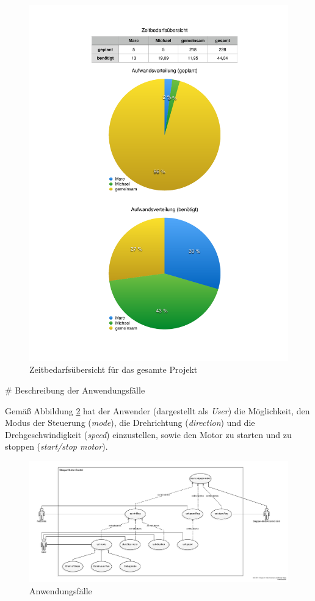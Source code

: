 \documentclass[ngerman,fontsize=12pt , paper=a4 , twoside=false , DIV12 , BCOR=1cm ,
numbers=enddot , listof=totoc , bibliography=totoc , index=totoc ,
headings=small , headlines=1.5 , final]{scrbook}
\begin{document}
\begin{figure}[htbp]
\centering
\includegraphics{../../Planning/Zeitbedarf.pdf}
\caption{Zeitbedarfsübersicht für das gesamte
Projekt\label{fig:zeitbedarf}}
\end{figure}

\newpage
\# Beschreibung der Anwendungsfälle

Gemäß Abbildung \ref{fig:anwendungsfaelle} hat der Anwender (dargestellt
als \emph{User}) die Möglichkeit, den Modus der Steuerung (\emph{mode}),
die Drehrichtung (\emph{direction}) und die Drehgeschwindigkeit
(\emph{speed}) einzustellen, sowie den Motor zu starten und zu stoppen
(\emph{start/stop motor}).

\begin{figure}[htbp]
\centering
\includegraphics{../Diagrams/UseCases.pdf}
\caption{Anwendungsfälle\label{fig:anwendungsfaelle}}
\end{figure}
\end{document}
